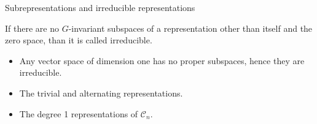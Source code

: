 \documentclass[10pt]{beamer}
\newcommand{\Cyc}{\mathcal{C}}
\newcommand{\id}{\text{id}}
\begin{document}
%				
%
%				
%								
	\begin{frame}{Subrepresentations and irreducible representations}		
		\begin{definition}
			If there are no $G$-invariant subspaces of a representation other than itself and the zero space, than it is called \alert{irreducible}.
		\end{definition}\pause
	
		\begin{example}
			\begin{itemize}
				\item Any vector space of dimension one has no proper subspaces, hence they are irreducible.
				
				\item The trivial and alternating representations.
				
				\item The degree 1 representations of $\Cyc_n$.
			\end{itemize}
		\end{example}
	\end{frame}
\end{document}
